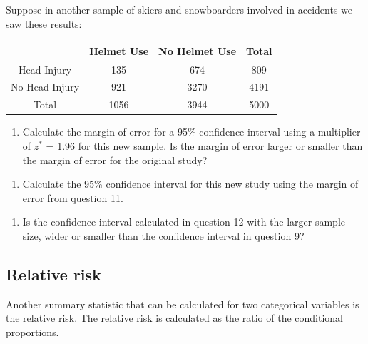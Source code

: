 \documentclass[
]{report}
\providecommand{\tightlist}{%
  \setlength{\itemsep}{0pt}\setlength{\parskip}{0pt}}
\begin{document}
Suppose in another sample of skiers and snowboarders involved in accidents we saw these results:

\begin{longtable}[]{@{}cccc@{}}
\toprule
& Helmet Use & No Helmet Use & Total\tabularnewline
\midrule
\endhead
Head Injury & 135 & 674 & 809\tabularnewline
No Head Injury & 921 & 3270 & 4191\tabularnewline
Total & 1056 & 3944 & 5000\tabularnewline
\bottomrule
\end{longtable}

\begin{enumerate}
\def\labelenumi{\arabic{enumi}.}
\setcounter{enumi}{10}
\tightlist
\item
  Calculate the margin of error for a 95\% confidence interval using a multiplier of \(z^*\) = 1.96 for this new sample. Is the margin of error larger or smaller than the margin of error for the original study?
\end{enumerate}

\vspace{1in}

\begin{enumerate}
\def\labelenumi{\arabic{enumi}.}
\setcounter{enumi}{11}
\tightlist
\item
  Calculate the 95\% confidence interval for this new study using the margin of error from question 11.
\end{enumerate}

\vspace{1in}

\begin{enumerate}
\def\labelenumi{\arabic{enumi}.}
\setcounter{enumi}{12}
\tightlist
\item
  Is the confidence interval calculated in question 12 with the larger sample size, wider or smaller than the confidence interval in question 9?
\end{enumerate}

\vspace{1in}

\newpage

\hypertarget{relative-risk}{%
\subsection{Relative risk}\label{relative-risk}}

Another summary statistic that can be calculated for two categorical variables is the relative risk. The relative risk is calculated as the ratio of the conditional proportions.
\end{document}
